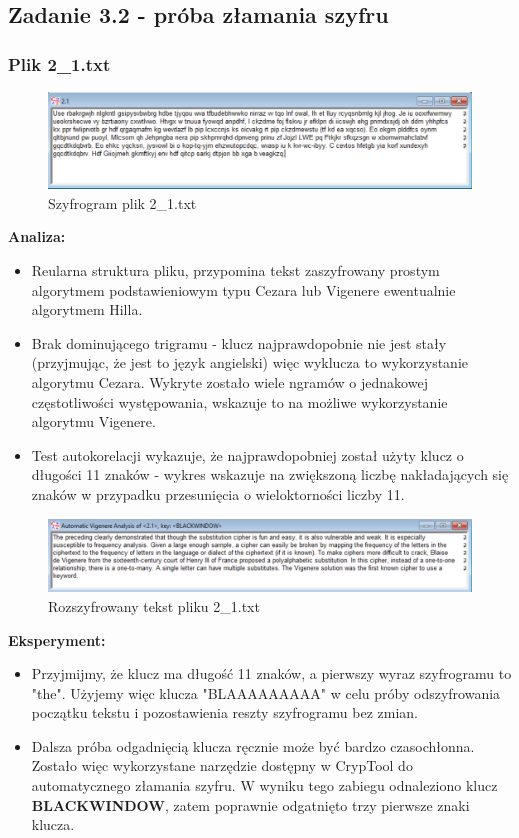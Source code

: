 \documentclass{article}
\begin{document}
\subsection*{Zadanie 3.2 - próba złamania szyfru}
\subsubsection*{Plik 2\_1.txt}
\begin{figure}[H]
    \centering
    \includegraphics[width=\textwidth]{2_1.png}
    \caption{Szyfrogram plik 2\_1.txt}
\end{figure}
\textbf{Analiza: }
\begin{itemize}
    \item Reularna struktura pliku, przypomina tekst zaszyfrowany prostym algorytmem podstawieniowym typu Cezara lub Vigenere ewentualnie algorytmem Hilla.
    \item Brak dominującego trigramu - klucz najprawdopobnie nie jest stały (przyjmując, że jest to język angielski) więc wyklucza to wykorzystanie algorytmu
    Cezara. Wykryte zostało wiele ngramów o jednakowej częstotliwości występowania, wskazuje to na możliwe wykorzystanie algorytmu Vigenere.
    \item Test autokorelacji wykazuje, że najprawdopobniej został użyty klucz o długości 11 znaków - wykres wskazuje na zwiększoną liczbę
    nakładających się znaków w przypadku przesunięcia o wieloktorności liczby 11.
\end{itemize}

\begin{figure}[H]
    \centering
    \includegraphics[width=\textwidth]{2_1_rozszyfrowany.png}
    \caption{Rozszyfrowany tekst pliku 2\_1.txt}
\end{figure}

\textbf{Eksperyment: }
\begin{itemize}
    \item Przyjmijmy, że klucz ma długość 11 znaków, a pierwszy wyraz szyfrogramu to "the". Użyjemy więc klucza "BLAAAAAAAAA" w celu próby odszyfrowania początku tekstu
    i pozostawienia reszty szyfrogramu bez zmian.
    \item Dalsza próba odgadnięcią klucza ręcznie może być bardzo czasochłonna. Zostało więc wykorzystane narzędzie dostępny w CrypTool do automatycznego złamania szyfru.
    W wyniku tego zabiegu odnaleziono klucz \textbf{BLACKWINDOW}, zatem poprawnie odgatnięto trzy pierwsze znaki klucza.
\end{itemize}
\end{document}
